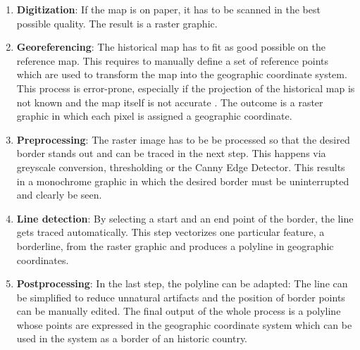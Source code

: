 \begin{enumerate}
  \item \textbf{Digitization}: If the map is on paper, it has to be scanned in the best possible quality. The result is a raster graphic.
  \item \textbf{Georeferencing}: The historical map has to fit as good possible on the reference map. This requires to manually define a set of reference points which are used to transform the map into the geographic coordinate system. This process is error-prone, especially if the projection of the historical map is not known and the map itself is not accurate
  \cite[pp. xvii]{knowles2002past}.
  The outcome is a raster graphic in which each pixel is assigned a geographic coordinate.
  \item \textbf{Preprocessing}: The raster image has to be be processed so that the desired border stands out and can be traced in the next step. This happens via greyscale conversion, thresholding or the Canny Edge Detector. This results in a monochrome graphic in which the desired border must be uninterrupted and clearly be seen.
  \item \textbf{Line detection}: By selecting a start and an end point of the border, the line gets traced automatically. This step vectorizes one particular feature, a borderline, from the raster graphic and produces a polyline in geographic coordinates.
  \item \textbf{Postprocessing}: In the last step, the polyline can be adapted: The line can be simplified to reduce unnatural artifacts and the position of border points can be manually edited. The final output of the whole process is a polyline whose points are expressed in the geographic coordinate system which can be used in the system as a border of an historic country.
\end{enumerate}

